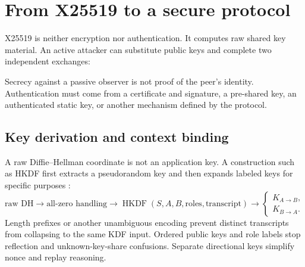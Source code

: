 \section{From X25519 to a secure protocol}

X25519 is neither encryption nor authentication. It computes raw shared key
material. An active attacker can substitute public keys and complete two
independent exchanges:

\begin{center}
\end{center}

Secrecy against a passive observer is not proof of the peer's identity.
Authentication must come from a certificate and signature, a pre-shared key,
an authenticated static key, or another mechanism defined by the protocol.

\subsection{Key derivation and context binding}

A raw Diffie--Hellman coordinate is not an application key. A construction
such as HKDF first extracts a pseudorandom key and then expands labeled keys
for specific purposes \cite{rfc5869}:
\[
  \text{raw DH}
  \longrightarrow
  \text{all-zero handling}
  \longrightarrow
  \operatorname{HKDF}(S,A,B,\text{roles},\text{transcript})
  \longrightarrow
  \begin{cases}
  K_{A\to B},\\
  K_{B\to A}.
  \end{cases}
\]
Length prefixes or another unambiguous encoding prevent distinct transcripts
from collapsing to the same KDF input. Ordered public keys and role labels stop
reflection and unknown-key-share confusions. Separate directional keys simplify
nonce and replay reasoning.

